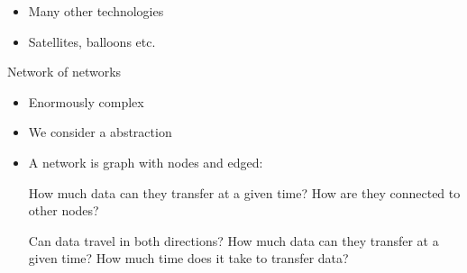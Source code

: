 \begin{itemize}
\begin{itemize}
                    \begin{itemize}
                        \item Many other technologies
                        \item Satellites, balloons etc.
                    \end{itemize}
        \end{itemize}
     Network of networks
        \begin{itemize}
            \item Enormously complex
            \item We consider a abstraction
            \item A network is graph with nodes and edged:
                \begin{itemize}
                        \begin{itemize}
                             How much data can they transfer at a given time?
                             How are they connected to other nodes?
                        \end{itemize}
                        \begin{itemize}
                             Can data travel in both directions?
                             How much data can they transfer at a given time?
                             How much time does it take to transfer data?
                        \end{itemize}
                \end{itemize}
        \end{itemize}
\end{itemize}

